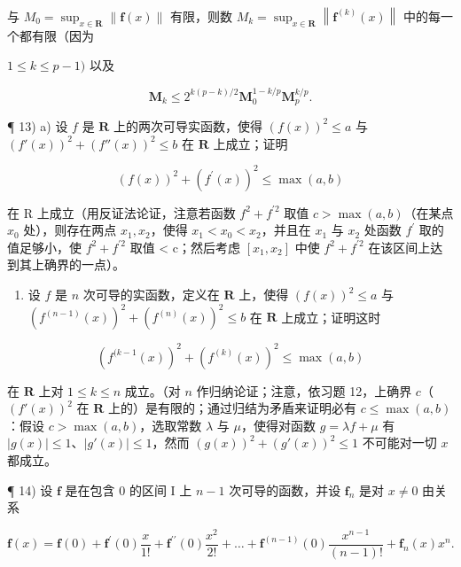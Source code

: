 与 \(M_{0}=\sup_{x\in\mathbf{R}}\|\mathbf{f}(x)\|\) 有限，则数 \(M_{k}=\sup_{x\in\mathbf{R}}\left\|\mathbf{f}^{(k)}(x)\right\|\) 中的每一个都有限（因为

\(1 \leqslant k \leqslant p - 1)\) 以及

\[
\mathbf {M} _ {k} \leqslant 2 ^ {k (p - k) / 2} \mathbf {M} _ {0} ^ {1 - k / p} \mathbf {M} _ {p} ^ {k / p}.
\]

¶ 13) a) 设 \(f\) 是 \(\mathbf{R}\) 上的两次可导实函数，使得 \((f(x))^2 \leqslant a\) 与 \((f'(x))^2 + (f''(x))^2 \leqslant b\) 在 \(\mathbf{R}\) 上成立；证明

\[
(f (x)) ^ {2} + \left(f ^ {\prime} (x)\right) ^ {2} \leqslant \max (a, b)
\]

在 R 上成立（用反证法论证，注意若函数 \(f^{2}+f^{\prime2}\) 取值 \(c > \max(a, b)\)（在某点 \(x_{0}\) 处），则存在两点 \(x_{1}, x_{2}\)，使得 \(x_{1} < x_{0} < x_{2}\)，并且在 \(x_{1}\) 与 \(x_{2}\) 处函数 \(f^{\prime}\) 取的值足够小，使 \(f^{2} + f^{\prime2}\) 取值 \textless{} c；然后考虑 \([x_{1}, x_{2}]\) 中使 \(f^{2} + f^{\prime2}\) 在该区间上达到其上确界的一点）。

\begin{enumerate}
\def\labelenumi{\alph{enumi})}
\setcounter{enumi}{1}
\tightlist
\item
  设 \(f\) 是 \(n\) 次可导的实函数，定义在 \(\mathbf{R}\) 上，使得 \((f(x))^2 \leqslant a\) 与 \((f^{(n - 1)}(x))^2 + (f^{(n)}(x))^2 \leqslant b\) 在 \(\mathbf{R}\) 上成立；证明这时
\end{enumerate}

\[
(f ^ {(k - 1} (x)) ^ {2} + (f ^ {(k)} (x)) ^ {2} \leqslant \max (a, b)
\]

在 \(\mathbf{R}\) 上对 \(1 \leqslant k \leqslant n\) 成立。（对 \(n\) 作归纳论证；注意，依习题 12，上确界 \(c\)（\((f'(x))^2\) 在 \(\mathbf{R}\) 上的）是有限的；通过归结为矛盾来证明必有 \(c \leqslant \max(a, b)\)：假设 \(c > \max(a, b)\)，选取常数 \(\lambda\) 与 \(\mu\)，使得对函数 \(g = \lambda f + \mu\) 有 \(|g(x)| \leqslant 1\)、\(|g'(x)| \leqslant 1\)，然而 \((g(x))^2 + (g'(x))^2 \leqslant 1\) 不可能对一切 \(x\) 都成立。

¶ 14) 设 \(\mathbf{f}\) 是在包含 0 的区间 I 上 \(n - 1\) 次可导的函数，并设 \(\mathbf{f}_n\) 是对 \(x \neq 0\) 由关系

\[
\mathbf {f} (x) = \mathbf {f} (0) + \mathbf {f} ^ {\prime} (0) \frac {x}{1 !} + \mathbf {f} ^ {\prime \prime} (0) \frac {x ^ {2}}{2 !} + \dots + \mathbf {f} ^ {(n - 1)} (0) \frac {x ^ {n - 1}}{(n - 1) !} + \mathbf {f} _ {n} (x) x ^ {n}.
\]


